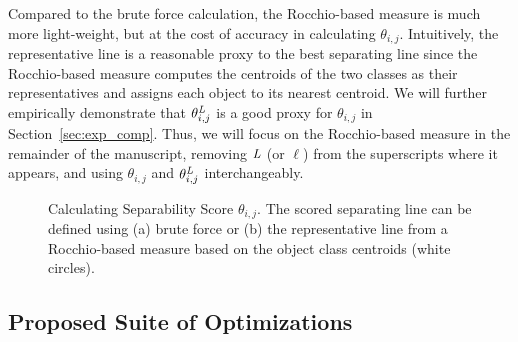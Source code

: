  Compared to the brute force calculation, the Rocchio-based measure is much more light-weight, but at the cost of accuracy in calculating $\theta_{i,j}$. Intuitively, the representative line is a reasonable proxy to the best separating line since the Rocchio-based measure computes the centroids of the two classes as their representatives and assigns each object to its nearest centroid. We will further empirically demonstrate that $\theta_{i,j}^{\mathit{L}}$ is a good proxy for $\theta_{i,j}$ in Section~\ref{sec:exp_comp}. Thus, we will focus on the Rocchio-based measure in the remainder of the manuscript, removing $\mathit{L}$ (or $\ell$) from the superscripts where it appears, and using $\theta_{i,j}$ and $\theta_{i,j}^{\mathit{L}}$ interchangeably.


\begin{figure}[h]
\centering %
\vspace{-5mm}
\vspace{-5mm}
\caption{Calculating Separability Score $\theta_{i,j}$. The scored separating line can be defined using (a) brute force or (b) the representative line from a Rocchio-based measure based on the object class centroids (white circles).}
\vspace{-5mm}
\label{fig:metric}
\end{figure}
\subsection{Proposed Suite of Optimizations}\label{sec:opt}

